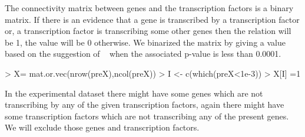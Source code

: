 \documentclass[11pt, a4paper, oneside]{article}
\begin{document}
The connectivity matrix between genes and the transcription factors is a binary matrix. If there is an evidence that a gene is transcribed by a transcription factor or, a transcription factor is transcribing some other genes then the relation will be 1, the value will be 0 otherwise. We binarized the matrix by giving a value based on the suggestion of ~\cite{lee:01} when the associated p-value is less than 0.0001.
\begin{Schunk}
\begin{Sinput}
> X= mat.or.vec(nrow(preX),ncol(preX))
> I <- c(which(preX<1e-3))
> X[I] =1
\end{Sinput}
\end{Schunk}

In the experimental dataset there might have some genes which are not transcribing by any of the given transcription factors, again there might have some transcription factors which are not transcribing any of the present genes. We will exclude those genes and transcription factors.
\end{document}
